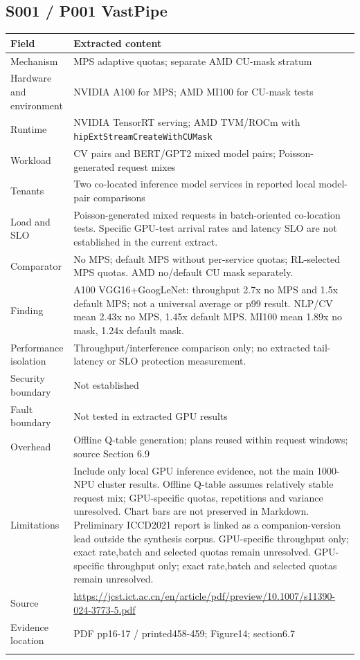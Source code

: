 \clearpage\subsection{S001 / P001 VastPipe}

\cite{P001}

\begin{longtable}{>{\raggedright\arraybackslash}p{}>{\raggedright\arraybackslash}p{}}
\toprule
\textbf{Field} & \textbf{Extracted content}\\\midrule\endhead
Mechanism & MPS adaptive quotas; separate AMD CU-mask stratum\\\addlinespace
Hardware and environment & NVIDIA A100 for MPS; AMD MI100 for CU-mask tests\\\addlinespace
Runtime & NVIDIA TensorRT serving; AMD TVM/ROCm with \nolinkurl{hipExtStreamCreateWithCUMask}\\\addlinespace
Workload & CV pairs and BERT/GPT2 mixed model pairs; Poisson-generated request mixes\\\addlinespace
Tenants & Two co-located inference model services in reported local model-pair comparisons\\\addlinespace
Load and SLO & Poisson-generated mixed requests in batch-oriented co-location tests. Specific GPU-test arrival rates and latency SLO are not established in the current extract.\\\addlinespace
Comparator & No MPS; default MPS without per-service quotas; RL-selected MPS quotas. AMD no/default CU mask separately.\\\addlinespace
Finding & A100 VGG16+GoogLeNet: throughput 2.7x no MPS and 1.5x default MPS; not a universal average or p99 result. NLP/CV mean 2.43x no MPS, 1.45x default MPS. MI100 mean 1.89x no mask, 1.24x default mask.\\\addlinespace
Performance isolation & Throughput/interference comparison only; no extracted tail-latency or SLO protection measurement.\\\addlinespace
Security boundary & Not established\\\addlinespace
Fault boundary & Not tested in extracted GPU results\\\addlinespace
Overhead & Offline Q-table generation; plans reused within request windows; source Section 6.9\\\addlinespace
Limitations & Include only local GPU inference evidence, not the main 1000-NPU cluster results. Offline Q-table assumes relatively stable request mix; GPU-specific quotas, repetitions and variance unresolved. Chart bars are not preserved in Markdown. Preliminary ICCD2021 report is linked as a companion-version lead outside the synthesis corpus. GPU-specific throughput only; exact rate,batch and selected quotas remain unresolved. GPU-specific throughput only; exact rate,batch and selected quotas remain unresolved.\\\addlinespace
Source & \url{https://jcst.ict.ac.cn/en/article/pdf/preview/10.1007/s11390-024-3773-5.pdf}\\\addlinespace
Evidence location & PDF pp16-17 / printed458-459; Figure14; section6.7\\\addlinespace
\bottomrule\end{longtable}


